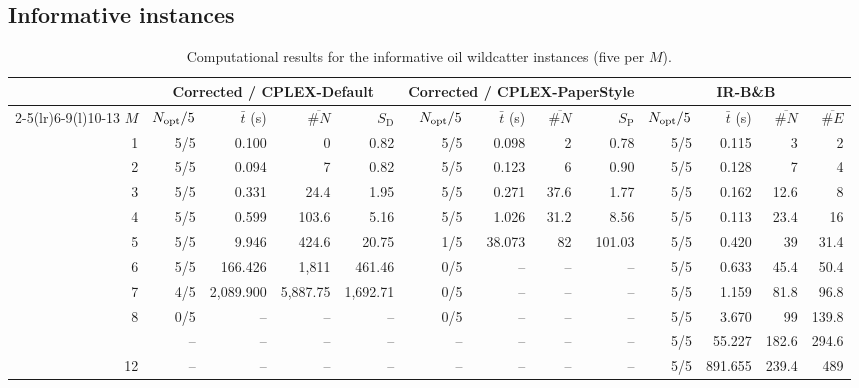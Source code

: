 \documentclass[11pt,a4paper]{article}
\begin{document}
\subsection{Informative instances}\label{sec:info}
\begin{table}[H]
\centering
\begin{threeparttable}
\caption{Computational results for the informative oil wildcatter instances (five per $M$).}\label{tab:info}
\setlength{\tabcolsep}{2.5pt}
{\scriptsize
\begin{tabular}{r rrrr rrrr rrrr}
\toprule
 & \multicolumn{4}{c}{Corrected / CPLEX-Default} & \multicolumn{4}{c}{Corrected / CPLEX-PaperStyle} & \multicolumn{4}{c}{IR-B\&B} \\
\cmidrule(lr){2-5}\cmidrule(lr){6-9}\cmidrule(l){10-13}
$M$ & $N_{\rm opt}/5$ & $\bar t$ (s) & $\overline{\#N}$ & $S_\mathrm{D}$
& $N_{\rm opt}/5$ & $\bar t$ (s) & $\overline{\#N}$ & $S_\mathrm{P}$
& $N_{\rm opt}/5$ & $\bar t$ (s) & $\overline{\#N}$ & $\overline{\#E}$ \\
\midrule
1 & 5/5 & 0.100 & 0 & 0.82 & 5/5 & 0.098 & 2 & 0.78 & 5/5 & 0.115 & 3 & 2 \\
2 & 5/5 & 0.094 & 7 & 0.82 & 5/5 & 0.123 & 6 & 0.90 & 5/5 & 0.128 & 7 & 4 \\
3 & 5/5 & 0.331 & 24.4 & 1.95 & 5/5 & 0.271 & 37.6 & 1.77 & 5/5 & 0.162 & 12.6 & 8 \\
4 & 5/5 & 0.599 & 103.6 & 5.16 & 5/5 & 1.026 & 31.2 & 8.56 & 5/5 & 0.113 & 23.4 & 16 \\
5 & 5/5 & 9.946 & 424.6 & 20.75 & 1/5 & 38.073 & 82 & 101.03 & 5/5 & 0.420 & 39 & 31.4 \\
6 & 5/5 & 166.426 & 1,811 & 461.46 & 0/5 & -- & -- & -- & 5/5 & 0.633 & 45.4 & 50.4 \\
7 & 4/5 & 2,089.900 & 5,887.75 & 1,692.71 & 0/5 & -- & -- & -- & 5/5 & 1.159 & 81.8 & 96.8 \\
8 & 0/5 & -- & -- & -- & 0/5 & -- & -- & -- & 5/5 & 3.670 & 99 & 139.8 \\
\addlinespace[2pt]
10 & -- & -- & -- & -- & -- & -- & -- & -- & 5/5 & 55.227 & 182.6 & 294.6 \\
12 & -- & -- & -- & -- & -- & -- & -- & -- & 5/5 & 891.655 & 239.4 & 489 \\
\bottomrule
\end{tabular}}
\begin{tablenotes}[flushleft]\footnotesize

\end{tablenotes}
\end{threeparttable}
\end{table}
\end{document}
